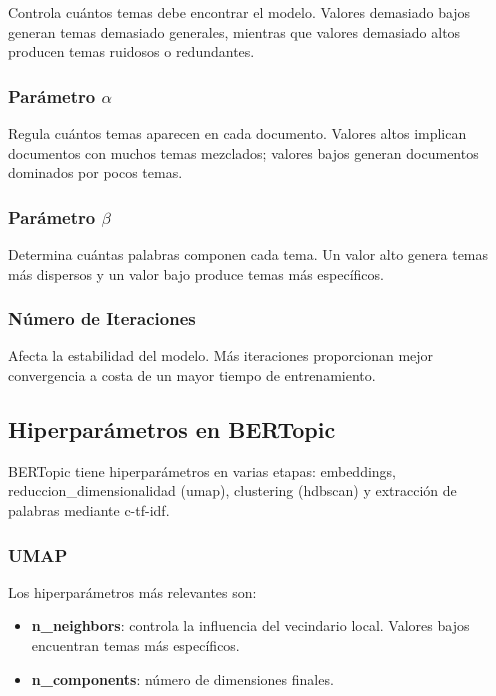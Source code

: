 Controla cuántos temas debe encontrar el modelo. Valores demasiado bajos
generan temas demasiado generales, mientras que valores demasiado altos
producen temas ruidosos o redundantes.

\subsubsection{Parámetro $\alpha$}

Regula cuántos temas aparecen en cada documento. Valores altos implican
documentos con muchos temas mezclados; valores bajos generan documentos
dominados por pocos temas.

\subsubsection{Parámetro $\beta$}

Determina cuántas palabras componen cada tema. Un valor alto genera temas más
dispersos y un valor bajo produce temas más específicos.

\subsubsection{Número de Iteraciones}

Afecta la estabilidad del modelo. Más iteraciones proporcionan mejor
convergencia a costa de un mayor tiempo de entrenamiento.

\subsection{Hiperparámetros en BERTopic}

BERTopic tiene hiperparámetros en varias etapas: \gls{embeddings},
\gls{reduccion_dimensionalidad} (\acrshort{umap}), \gls{clustering}
(\acrshort{hdbscan}) y extracción de palabras mediante \acrshort{c-tf-idf}.

\subsubsection{UMAP}

Los hiperparámetros más relevantes son:
\begin{itemize}
	\item \textbf{n\_neighbors}: controla la influencia del vecindario local. Valores bajos encuentran temas más específicos.
	\item \textbf{n\_components}: número de dimensiones finales.
\end{itemize}

